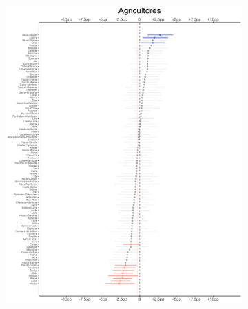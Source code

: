 \begin{figure}
	\centering
	\begin{subfigure}{0.45\textwidth}
	\includegraphics[width = \textwidth]{Figs/Efectos/Efectos_CSP1_Modelo_H}
	\end{subfigure}
	~
	\begin{subfigure}{0.45\textwidth}

\end{subfigure}
\end{figure}
